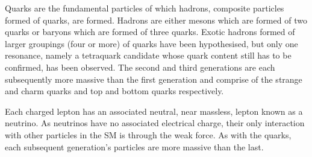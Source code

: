 Quarks are the fundamental particles of which hadrons, composite particles formed of quarks, are formed. 
Hadrons are either mesons which are formed of two quarks or baryons which are formed of three quarks. 
Exotic hadrons formed of larger groupings (four or more) of quarks have been hypothesised, but only one resonance, namely a tetraquark candidate whose quark content still has to be confirmed, has been observed\cite{PhysRevLett.112.222002}. 
The second and third generations are each subsequently more massive than the first generation and comprise of the strange and charm quarks and top and bottom quarks respectively. 



Each charged lepton has an associated neutral, near massless, lepton known as a neutrino. 
As neutrinos have no associated electrical charge, their only interaction with other particles in the SM is through the weak force. 
As with the quarks, each subsequent generation's particles are more massive than the last. 


